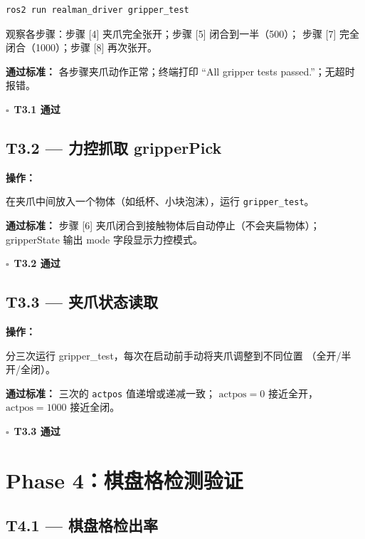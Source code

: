 \documentclass[12pt,a4paper,fontset=ubuntu]{ctexart}
\newcommand{\chkbox}{$\square$}
\newcommand{\passcriteria}[1]{%
  \textbf{通过标准：} #1%
}
\begin{document}
\begin{lstlisting}[language=bash]
ros2 run realman_driver gripper_test
\end{lstlisting}

观察各步骤：步骤 [4] 夹爪完全张开；步骤 [5] 闭合到一半（500）；
步骤 [7] 完全闭合（1000）；步骤 [8] 再次张开。

\passcriteria{
  各步骤夹爪动作正常；终端打印 ``All gripper tests passed.''；无超时报错。
}

\begin{center}\chkbox\ \textbf{T3.1 通过}\end{center}


\subsection{T3.2 — 力控抓取 gripperPick}

\textbf{操作：}

在夹爪中间放入一个物体（如纸杯、小块泡沫），运行 \texttt{gripper\_test}。

\passcriteria{
  步骤 [6] 夹爪闭合到接触物体后自动停止（不会夹扁物体）；
  gripperState 输出 mode 字段显示力控模式。
}

\begin{center}\chkbox\ \textbf{T3.2 通过}\end{center}


\subsection{T3.3 — 夹爪状态读取}

\textbf{操作：}

分三次运行 gripper\_test，每次在启动前手动将夹爪调整到不同位置
（全开/半开/全闭）。

\passcriteria{
  三次的 \texttt{actpos} 值递增或递减一致；
  $\text{actpos}=0$ 接近全开，$\text{actpos}=1000$ 接近全闭。
}

\begin{center}\chkbox\ \textbf{T3.3 通过}\end{center}

\section{Phase 4：棋盘格检测验证}

\subsection{T4.1 — 棋盘格检出率}
\end{document}
